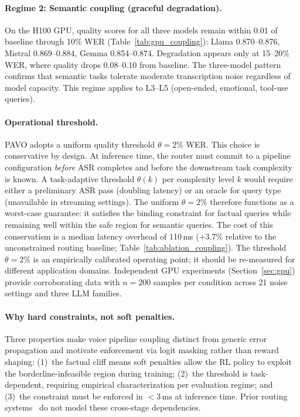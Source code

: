 \documentclass{article}
\begin{document}
\paragraph{Regime 2: Semantic coupling (graceful degradation).}
On the H100 GPU, quality scores for all three models remain within 0.01 of baseline through 10\% WER (Table~\ref{tab:gpu_coupling}): Llama 0.870--0.876, Mistral 0.869--0.884, Gemma 0.854--0.874. Degradation appears only at 15--20\% WER, where quality drops 0.08--0.10 from baseline. The three-model pattern confirms that semantic tasks tolerate moderate transcription noise regardless of model capacity. This regime applies to L3--L5 (open-ended, emotional, tool-use queries).

\paragraph{Operational threshold.}
PAVO adopts a uniform quality threshold $\theta = 2\%$ WER. This choice is conservative by design. At inference time, the router must commit to a pipeline configuration \emph{before} ASR completes and before the downstream task complexity is known. A task-adaptive threshold $\theta(k)$ per complexity level $k$ would require either a preliminary ASR pass (doubling latency) or an oracle for query type (unavailable in streaming settings). The uniform $\theta = 2\%$ therefore functions as a worst-case guarantee: it satisfies the binding constraint for factual queries while remaining well within the safe region for semantic queries. The cost of this conservatism is a median latency overhead of 110\,ms ($+3.7\%$ relative to the unconstrained routing baseline; Table~\ref{tab:ablation_coupling}). The threshold $\theta=2\%$ is an empirically calibrated operating point; it should be re-measured for different application domains. Independent GPU experiments (Section~\ref{sec:gpu}) provide corroborating data with $n=200$ samples per condition across 21 noise settings and three LLM families.

\paragraph{Why hard constraints, not soft penalties.}
Three properties make voice pipeline coupling distinct from generic error propagation and motivate enforcement via logit masking rather than reward shaping: (1)~the factual cliff means soft penalties allow the RL policy to exploit the borderline-infeasible region during training; (2)~the threshold is task-dependent, requiring empirical characterization per evaluation regime; and (3)~the constraint must be enforced in $<$3\,ms at inference time. Prior routing systems~\citep{clipper2017,romero2021infaas,gujarati2023shepherd} do not model these cross-stage dependencies.
\end{document}

